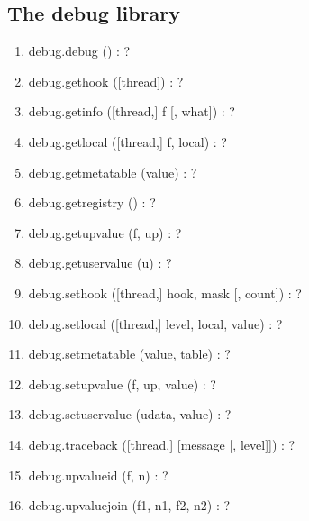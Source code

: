 \subsection{The debug library}

\begin{enumerate}
\item debug.debug () : ?
\item debug.gethook ([thread]) : ?
\item debug.getinfo ([thread,] f [, what]) : ?
\item debug.getlocal ([thread,] f, local) : ?
\item debug.getmetatable (value) : ?
\item debug.getregistry () : ?
\item debug.getupvalue (f, up) : ?
\item debug.getuservalue (u) : ?
\item debug.sethook ([thread,] hook, mask [, count]) : ?
\item debug.setlocal ([thread,] level, local, value) : ?
\item debug.setmetatable (value, table) : ?
\item debug.setupvalue (f, up, value) : ?
\item debug.setuservalue (udata, value) : ?
\item debug.traceback ([thread,] [message [, level]]) : ?
\item debug.upvalueid (f, n) : ?
\item debug.upvaluejoin (f1, n1, f2, n2) : ?
\end{enumerate}

